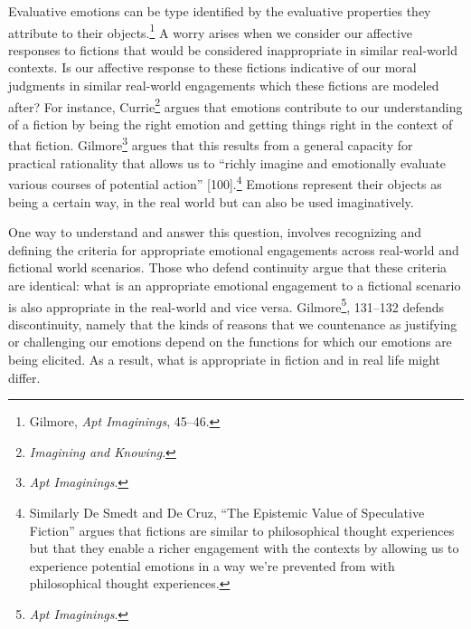 \documentclass[phdthesis,12pt,final]{wuthesis}
\theoremstyle{definition}
\theoremstyle{definition}
\theoremstyle{definition}
\theoremstyle{definition}
\theoremstyle{remark}
\begin{document}
Evaluative emotions can be type identified by the evaluative properties they attribute to their objects.\footnote{Gilmore, \emph{Apt {Imaginings}}, 45--46.} A worry arises when we consider our affective responses to fictions that would be considered inappropriate in similar real-world contexts. Is our affective response to these fictions indicative of our moral judgments in similar real-world engagements which these fictions are modeled after? For instance, Currie\footnote{\emph{Imagining and Knowing}.} argues that emotions contribute to our understanding of a fiction by being the right emotion and getting things right in the context of that fiction. Gilmore\footnote{\emph{Apt {Imaginings}}.} argues that this results from a general capacity for practical rationality that allows us to ``richly imagine and emotionally evaluate various courses of potential action'' {[}100{]}.\footnote{Similarly De Smedt and De Cruz, {``The Epistemic Value of Speculative Fiction''} argues that fictions are similar to philosophical thought experiences but that they enable a richer engagement with the contexts by allowing us to experience potential emotions in a way we're prevented from with philosophical thought experiences.} Emotions represent their objects as being a certain way, in the real world but can also be used imaginatively.

One way to understand and answer this question, involves recognizing and defining the criteria for appropriate emotional engagements across real-world and fictional world scenarios. Those who defend continuity argue that these criteria are identical: what is an appropriate emotional engagement to a fictional scenario is also appropriate in the real-world and vice versa. Gilmore\footnote{\emph{Apt {Imaginings}}.}, 131--132 defends discontinuity, namely that the kinds of reasons that we countenance as justifying or challenging our emotions depend on the functions for which our emotions are being elicited. As a result, what is appropriate in fiction and in real life might differ.
\end{document}
